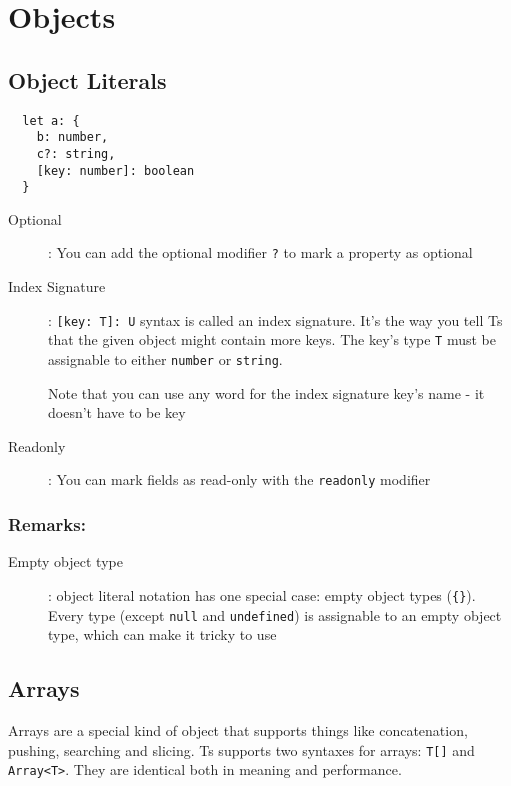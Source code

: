 \documentclass[french]{article}
\begin{document}
\section{Objects}

\subsection{Object Literals}

\begin{lstlisting}
  let a: {
    b: number,
    c?: string,
    [key: number]: boolean
  }
\end{lstlisting}

\begin{description}
  \item[Optional]: You can add the optional modifier \lstinline{?} to mark a property as optional
  \item[Index Signature]: 
    \lstinline{[key: T]: U} syntax is called an index signature. It's the way you tell Ts that the given object might contain more keys. The key's type \lstinline{T} must be assignable to either \lstinline{number} or \lstinline{string}.

    Note that you can use any word for the index signature key's name - it doesn't have to be key
  \item[Readonly]: You can mark fields as read-only with the \lstinline{readonly} modifier
\end{description}


\subsubsection*{Remarks:}

\begin{description}
  \item[Empty object type]: object literal notation has one special case: empty object types (\lstinline|{}|). Every type (except \lstinline{null} and \lstinline{undefined}) is assignable to an empty object type, which can make it tricky to use

\end{description}

\subsection{Arrays}

Arrays are a special kind of object that supports things like concatenation, pushing, searching and slicing. Ts supports two syntaxes for arrays: \lstinline{T[]} and \lstinline{Array<T>}. They are identical both in meaning and performance.
\end{document}
